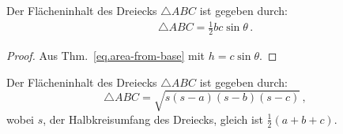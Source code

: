 \begin{theorem} Der Flächeninhalt des Dreiecks $\triangle ABC$ ist gegeben durch:
\begin{align}\label{eq.area-from-sine}
\triangle ABC = \frac{1}{2}bc\sin \theta\,.
\end{align}
\end{theorem}
\begin{proof} Aus Thm.~\ref{eq.area-from-base} mit
$h=c\sin \theta$.
\end{proof}


\begin{theorem}[Heron] Der Flächeninhalt des Dreiecks $\triangle ABC$ ist gegeben durch:\label{thm.heron} 
\[
\triangle ABC = \sqrt{s(s-a)(s-b)(s-c)}\,,
\]
wobei $s$, der Halbkreisumfang des Dreiecks, gleich ist $\frac{1}{2}(a+b+c)$.
\end{theorem}

